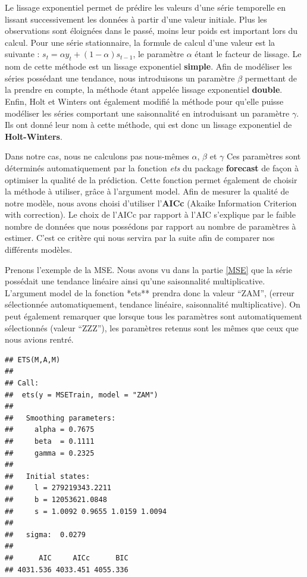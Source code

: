 \documentclass[11pt,]{article}
\begin{document}
Le lissage exponentiel permet de prédire les valeurs d'une série
temporelle en lissant successivement les données à partir d'une valeur
initiale. Plus les observations sont éloignées dans le passé, moins leur
poids est important lors du calcul. Pour une série stationnaire, la
formule de calcul d'une valeur est la suivante :
\(s_t = \alpha y_t + (1-\alpha) s_{t-1}\), le paramètre \(\alpha\) étant
le facteur de lissage. Le nom de cette méthode est un lissage
exponentiel \textbf{simple}. Afin de modéliser les séries possédant une
tendance, nous introduisons un paramètre \(\beta\) permettant de la
prendre en compte, la méthode étant appelée lissage exponentiel
\textbf{double}. Enfin, Holt et Winters ont également modifié la méthode
pour qu'elle puisse modéliser les séries comportant une saisonnalité en
introduisant un paramètre \(\gamma\). Ils ont donné leur nom à cette
méthode, qui est donc un lissage exponentiel de \textbf{Holt-Winters}.

Dans notre cas, nous ne calculons pas nous-mêmes \(\alpha\), \(\beta\)
et \(\gamma\) Ces paramètres sont déterminés automatiquement par la
fonction \emph{ets} du package \textbf{forecast} de façon à optimiser la
qualité de la prédiction. Cette fonction permet également de choisir la
méthode à utiliser, grâce à l'argument model. Afin de mesurer la qualité
de notre modèle, nous avons choisi d'utiliser l'\textbf{AICc} (Akaike
Information Criterion with correction). Le choix de l'AICc par rapport à
l'AIC s'explique par le faible nombre de données que nous possédons par
rapport au nombre de paramètres à estimer. C'est ce critère qui nous
servira par la suite afin de comparer nos différents modèles.
\label{AICc}

Prenons l'exemple de la MSE. Nous avons vu dans la partie \ref{MSE} que
la série possédait une tendance linéaire ainsi qu'une saisonnalité
multiplicative. L'argument model de la fonction *ets** prendra donc la
valeur ``ZAM'', (erreur sélectionnée automatiquement, tendance linéaire,
saisonnalité multiplicative). On peut également remarquer que lorsque
tous les paramètres sont automatiquement sélectionnés (valeur ``ZZZ''),
les paramètres retenus sont les mêmes que ceux que nous avions rentré.

\begin{verbatim}
## ETS(M,A,M) 
## 
## Call:
##  ets(y = MSETrain, model = "ZAM") 
## 
##   Smoothing parameters:
##     alpha = 0.7675 
##     beta  = 0.1111 
##     gamma = 0.2325 
## 
##   Initial states:
##     l = 279219343.2211 
##     b = 12053621.0848 
##     s = 1.0092 0.9655 1.0159 1.0094
## 
##   sigma:  0.0279
## 
##      AIC     AICc      BIC 
## 4031.536 4033.451 4055.336
\end{verbatim}
\end{document}
